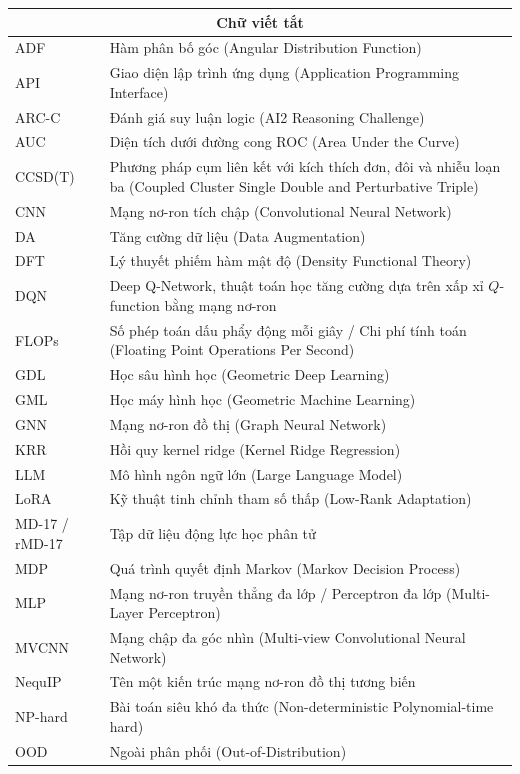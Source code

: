 \documentclass[oneside]{hcmus-report}
\theoremstyle{plain}
\theoremstyle{definition}
\begin{document}
\begin{longtable}{p{} p{}}
\multicolumn{2}{c}{\textbf{Chữ viết tắt}} \\
\hline
ADF & Hàm phân bố góc (Angular Distribution Function) \\
API & Giao diện lập trình ứng dụng (Application Programming Interface) \\
ARC-C & Đánh giá suy luận logic (AI2 Reasoning Challenge) \\
AUC & Diện tích dưới đường cong ROC (Area Under the Curve) \\
CCSD(T) & Phương pháp cụm liên kết với kích thích đơn, đôi và nhiễu loạn ba (Coupled Cluster Single Double and Perturbative Triple) \\
CNN & Mạng nơ-ron tích chập (Convolutional Neural Network) \\
DA & Tăng cường dữ liệu (Data Augmentation) \\
DFT & Lý thuyết phiếm hàm mật độ (Density Functional Theory) \\
DQN & Deep Q-Network, thuật toán học tăng cường dựa trên xấp xỉ $Q$-function bằng mạng nơ-ron \\
FLOPs & Số phép toán dấu phẩy động mỗi giây / Chi phí tính toán (Floating Point Operations Per Second) \\
GDL & Học sâu hình học (Geometric Deep Learning) \\
GML & Học máy hình học (Geometric Machine Learning) \\
GNN & Mạng nơ-ron đồ thị (Graph Neural Network) \\
KRR & Hồi quy kernel ridge (Kernel Ridge Regression) \\
LLM & Mô hình ngôn ngữ lớn (Large Language Model) \\
LoRA & Kỹ thuật tinh chỉnh tham số thấp (Low-Rank Adaptation) \\
MD-17 / rMD-17 & Tập dữ liệu động lực học phân tử \\
MDP & Quá trình quyết định Markov (Markov Decision Process) \\
MLP & Mạng nơ-ron truyền thẳng đa lớp / Perceptron đa lớp (Multi-Layer Perceptron) \\
MVCNN & Mạng chập đa góc nhìn (Multi-view Convolutional Neural Network) \\
NequIP & Tên một kiến trúc mạng nơ-ron đồ thị tương biến \\
NP-hard & Bài toán siêu khó đa thức (Non-deterministic Polynomial-time hard) \\
OOD & Ngoài phân phối (Out-of-Distribution) \\

\end{longtable}
\end{document}
